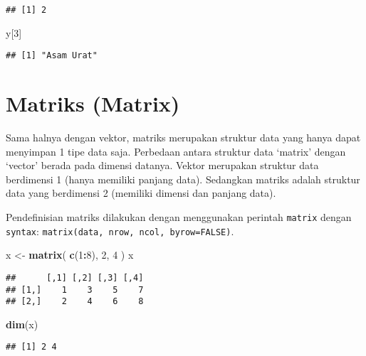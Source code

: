 \documentclass[
]{book}
\newenvironment{Shaded}{\begin{snugshade}}{\end{snugshade}}
\newcommand{\DecValTok}[1]{\textcolor[rgb]{0.00,0.00,0.81}{#1}}
\newcommand{\KeywordTok}[1]{\textcolor[rgb]{0.13,0.29,0.53}{\textbf{#1}}}
\newcommand{\NormalTok}[1]{#1}
\newcommand{\OperatorTok}[1]{\textcolor[rgb]{0.81,0.36,0.00}{\textbf{#1}}}
\newcommand{\StringTok}[1]{\textcolor[rgb]{0.31,0.60,0.02}{#1}}
\begin{document}
\begin{verbatim}
## [1] 2
\end{verbatim}

\begin{Shaded}
\begin{Highlighting}[]
\NormalTok{y[}\DecValTok{3}\NormalTok{]}
\end{Highlighting}
\end{Shaded}

\begin{verbatim}
## [1] "Asam Urat"
\end{verbatim}

\hypertarget{matrix}{%
\section{Matriks (Matrix)}\label{matrix}}

Sama halnya dengan vektor, matriks merupakan struktur data yang hanya dapat menyimpan 1 tipe data saja. Perbedaan antara struktur data `matrix' dengan `vector' berada pada dimensi datanya. Vektor merupakan struktur data berdimensi 1 (hanya memiliki panjang data). Sedangkan matriks adalah struktur data yang berdimensi 2 (memiliki dimensi dan panjang data).

Pendefinisian matriks dilakukan dengan menggunakan perintah \texttt{matrix} dengan \texttt{syntax}: \texttt{matrix(data,\ nrow,\ ncol,\ byrow=FALSE)}.

\begin{Shaded}
\begin{Highlighting}[]
\NormalTok{x <-}\StringTok{ }\KeywordTok{matrix}\NormalTok{(}
  \KeywordTok{c}\NormalTok{(}\DecValTok{1}\OperatorTok{:}\DecValTok{8}\NormalTok{), }\DecValTok{2}\NormalTok{, }\DecValTok{4}
\NormalTok{)}
\NormalTok{x}
\end{Highlighting}
\end{Shaded}

\begin{verbatim}
##      [,1] [,2] [,3] [,4]
## [1,]    1    3    5    7
## [2,]    2    4    6    8
\end{verbatim}

\begin{Shaded}
\begin{Highlighting}[]
\KeywordTok{dim}\NormalTok{(x)}
\end{Highlighting}
\end{Shaded}

\begin{verbatim}
## [1] 2 4
\end{verbatim}
\end{document}
